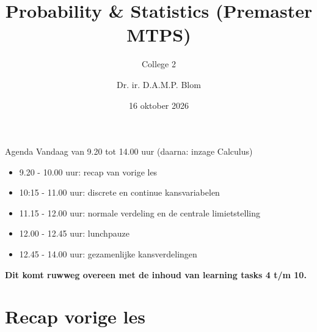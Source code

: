 \title[P\&S 2026/2027]{Probability \& Statistics (Premaster MTPS)}
\subtitle[College 2]{College 2}  
\author{Dr. ir. D.A.M.P. Blom}
\date{16 oktober 2026}




    \begin{frame}
        \maketitle
    \end{frame}

    \begin{frame}{Agenda}
        Vandaag van 9.20 tot 14.00 uur (daarna: inzage Calculus)
        \vfill
        \begin{itemize}
            \item 9.20 - 10.00 uur: recap van vorige les
            \item 10:15 - 11.00 uur: discrete en continue kansvariabelen
            \item 11.15 - 12.00 uur: normale verdeling en de centrale limietstelling
            \item 12.00 - 12.45 uur: lunchpauze
            \item 12.45 - 14.00 uur: gezamenlijke kansverdelingen
        \end{itemize}
        \vfill
        \textbf{Dit komt ruwweg overeen met de inhoud van learning tasks 4 t/m 10.}
    \end{frame}

\section{Recap vorige les}

